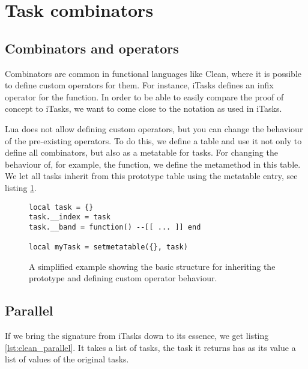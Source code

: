 \section{Task combinators}\label{section-combinators}

\subsection{Combinators and operators}
Combinators are common in functional languages like Clean, where it is possible to define custom operators for them. For instance, iTasks defines an infix operator \clean{>>*} for the  function. In order to be able to easily compare the proof of concept to iTasks, we want to come close to the notation as used in iTasks.

Lua does not allow defining custom operators, but you can change the behaviour of the pre-existing operators. To do this, we define a  table and use it not only to define all combinators, but also as a metatable for tasks. For changing the behaviour of, for example, the \lua{&} function, we define the  metamethod in this table. We let all tasks inherit from this prototype table using the  metatable entry, see listing \ref{lst:lua_task_metatable}.

\begin{figure}[ht]
\centering
\begin{verbatim}
local task = {}
task.__index = task
task.__band = function() --[[ ... ]] end

local myTask = setmetatable({}, task)
\end{verbatim}
\caption{A simplified example showing the basic structure for inheriting the prototype and defining custom operator behaviour.}
\label{lst:lua_task_metatable}
\end{figure}


\subsection{Parallel}
If we bring the  signature from iTasks down to its essence, we get listing \ref{lst:clean_parallel}. It takes a list of tasks, the task it returns has as its value a list of values of the original tasks.

